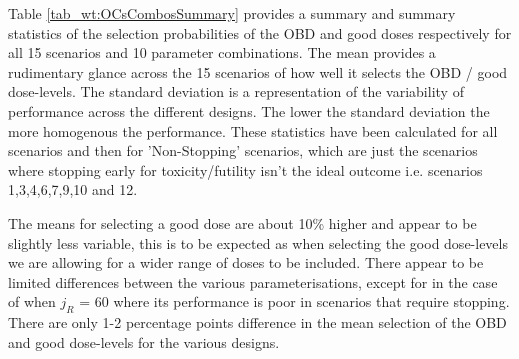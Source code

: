 Table \ref{tab_wt:OCsCombosSummary} provides a summary and summary statistics of the selection probabilities of the OBD and good doses respectively for all 15 scenarios and 10 parameter combinations. The mean provides a rudimentary glance across the 15 scenarios of how well it selects the OBD / good dose-levels. The standard deviation is a representation of the variability of performance across the different designs. The lower the standard deviation the more homogenous the performance. These statistics have been calculated for all scenarios and then for 'Non-Stopping' scenarios, which are just the scenarios where stopping early for toxicity/futility isn't the ideal outcome i.e. scenarios 1,3,4,6,7,9,10 and 12. 

The means for selecting a good dose are about 10\% higher and appear to be slightly less variable, this is to be expected as when selecting the good dose-levels we are allowing for a wider range of doses to be included. There appear to be limited differences between the various parameterisations, except for in the case of when $j_R$ = 60 where its performance is poor in scenarios that require stopping. There are only 1-2 percentage points difference in the mean selection of the OBD and good dose-levels for the various designs. 

